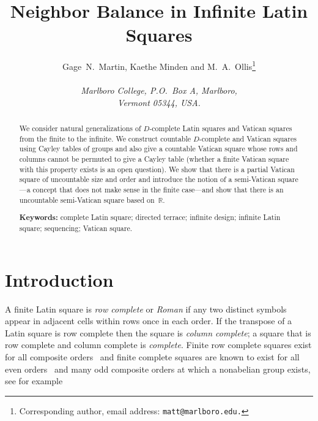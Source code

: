 \documentclass[12pt,a4paper]{article}
\newcommand{\R}{\mathbb{R}}
\begin{document}
\title{Neighbor Balance in Infinite Latin Squares}

\author{Gage~N.~Martin, Kaethe Minden and M.~A.~Ollis\footnote{Corresponding author, email address: \texttt{matt@marlboro.edu.}}   \\
              \\
              {\it Marlboro College, P.O.~Box A, Marlboro,} \\    
              {\it Vermont 05344, USA.}  }
              

\maketitle

\begin{abstract}
We consider natural generalizations of $D$-complete Latin squares and Vatican squares from the finite to the infinite.   We construct countable $D$-complete and Vatican squares using Cayley tables of groups and also give a countable Vatican square whose rows and columns cannot be permuted to give a Cayley table (whether a finite Vatican square with this property exists is an open question).  We show that there is a partial Vatican square of uncountable size and order and introduce the notion of a semi-Vatican square---a concept that does not make sense in the finite case---and show that there is an uncountable semi-Vatican square based on~$\R$.



\vspace{3mm}
\noindent
{\bf Keywords:} complete Latin square; directed terrace; infinite design; infinite Latin square; sequencing; Vatican square.
\end{abstract}



\section{Introduction}\label{sec:intro}


A finite Latin square is {\em row complete} or {\em Roman} if  any two distinct symbols appear in adjacent cells within rows once in each order.  If the transpose of a Latin square is row complete then the square is {\em column complete}; a square that is row complete and column complete is {\em complete}.  Finite row complete squares exist for all composite orders~\cite{Higham98} and finite complete squares are known to exist for all even orders~\cite{Gordon61} and many odd composite orders at which a nonabelian group exists, see for example \cite{Ollis14}
\end{document}
